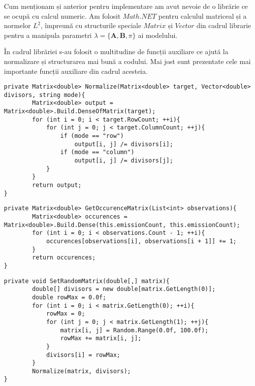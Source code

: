 Cum menționam și anterior pentru implementare am avut nevoie de o librărie ce se ocupă cu calcul numeric. Am folosit $Math.NET$ pentru calculul matriceal și a normelor $L^{2}$, împreună cu structurile speciale $Matrix$ și $Vector$ din cadrul librarie pentru a manipula parametri $\lambda = \{\textbf{A},\textbf{B},\pi\}$ ai modelului.\par

În cadrul librăriei s-au folosit o multitudine de funcții auxiliare ce ajută la normalizare și structurarea mai bună a codului. Mai jost sunt prezentate cele mai importante funcții auxiliare din cadrul acesteia.\par

\begin{lstlisting}[caption=Funcție auxiliara ce realizează normalizarea]
private Matrix<double> Normalize(Matrix<double> target, Vector<double> divisors, string mode){
        Matrix<double> output = Matrix<double>.Build.DenseOfMatrix(target);
        for (int i = 0; i < target.RowCount; ++i){
            for (int j = 0; j < target.ColumnCount; ++j){
                if (mode == "row")
                    output[i, j] /= divisors[i];
                if (mode == "column")
                    output[i, j] /= divisors[j];
            }
        }
        return output;
}
\end{lstlisting}


\begin{lstlisting}[caption=Funcție auxiliara ce construiește matricea de frecvență $C$]
private Matrix<double> GetOccurenceMatrix(List<int> observations){
        Matrix<double> occurences = Matrix<double>.Build.Dense(this.emissionCount, this.emissionCount);
        for (int i = 0; i < observations.Count - 1; ++i){
            occurences[observations[i], observations[i + 1]] += 1;
        }
        return occurences;
}
\end{lstlisting}

\begin{lstlisting}[caption=Funcție auxiliara ce contruieste o matrice cu intrări random]
private void SetRandomMatrix(double[,] matrix){
        double[] divisors = new double[matrix.GetLength(0)];
        double rowMax = 0.0f;
        for (int i = 0; i < matrix.GetLength(0); ++i){
            rowMax = 0;
            for (int j = 0; j < matrix.GetLength(1); ++j){
                matrix[i, j] = Random.Range(0.0f, 100.0f);
                rowMax += matrix[i, j];
            }
            divisors[i] = rowMax;
        }
        Normalize(matrix, divisors);
}
\end{lstlisting}
\clearpage

